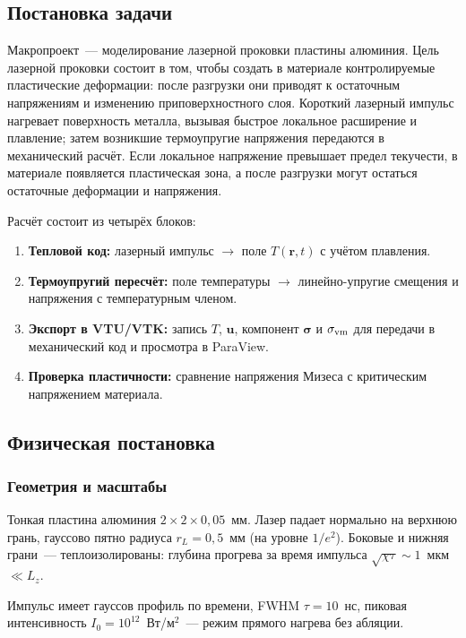 \subsection{Постановка задачи}

Макропроект~--- моделирование лазерной проковки пластины алюминия.
Цель лазерной проковки состоит в том, чтобы создать в материале
контролируемые пластические деформации: после разгрузки они приводят
к остаточным напряжениям и изменению приповерхностного слоя.
Короткий лазерный импульс нагревает поверхность металла, вызывая
быстрое локальное расширение и плавление; затем возникшие термоупругие напряжения
передаются в механический расчёт. Если локальное напряжение превышает
предел текучести, в материале появляется пластическая зона, а после
разгрузки могут остаться остаточные деформации и напряжения.

Расчёт состоит из четырёх блоков:
\begin{enumerate}
  \item \textbf{Тепловой код:} лазерный импульс $\to$
        поле $T(\mathbf{r},t)$ с учётом плавления.
  \item \textbf{Термоупругий пересчёт:} поле температуры $\to$
        линейно-упругие смещения и напряжения с температурным членом.
  \item \textbf{Экспорт в VTU/VTK:} запись $T$, $\mathbf{u}$,
        компонент $\boldsymbol{\sigma}$ и $\sigma_{\rm vm}$ для
        передачи в механический код и просмотра в ParaView.
  \item \textbf{Проверка пластичности:} сравнение напряжения Мизеса
        с критическим напряжением материала.
\end{enumerate}


\subsection{Физическая постановка}

\subsubsection{Геометрия и масштабы}

Тонкая пластина алюминия $2 \times 2 \times 0{,}05$~мм. Лазер падает
нормально на верхнюю грань, гауссово пятно радиуса $r_L = 0{,}5$~мм
(на уровне $1/e^2$). Боковые и нижняя грани~--- теплоизолированы:
глубина прогрева за время импульса $\sqrt{\chi\tau} \sim 1$~мкм $\ll L_z$.

Импульс имеет гауссов профиль по времени, FWHM $\tau = 10$~нс,
пиковая интенсивность
$I_0 = 10^{12}$~Вт/м$^2$~--- режим прямого нагрева без абляции.

